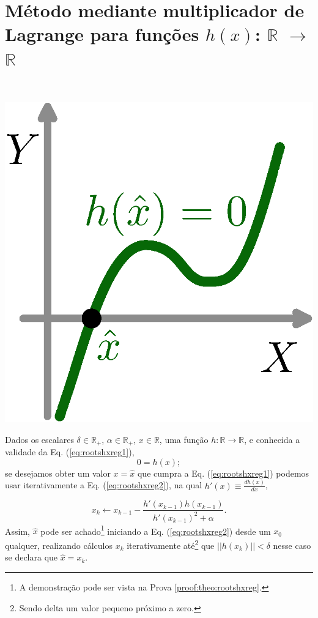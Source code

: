 
\section{ Método mediante multiplicador de Lagrange para funções $h(x)$: $\mathbb{R}$ $\rightarrow$ $\mathbb{R}$ }

\begin{theorem}\label{theo:rootshxreg}
~\\
\begin{minipage}{0.2\textwidth}
\centering
\includegraphics[width=0.90\linewidth]{chapters/roots/roots1.eps} 
\end{minipage}
\begin{minipage}{0.8\textwidth}
Dados
os escalares $\delta \in \mathbb{R}_+$, 
$\alpha \in \mathbb{R}_+$, 
$x \in \mathbb{R}$, 
uma função $h:\mathbb{R} \rightarrow \mathbb{R}$, e 
conhecida a validade da Eq. (\ref{eq:rootshxreg1}),
\begin{equation}\label{eq:rootshxreg1}
0=h(x);
\end{equation}
se desejamos obter um valor $x=\hat{x}$ que cumpra a Eq. (\ref{eq:rootshxreg1})
podemos usar iterativamente a Eq. (\ref{eq:rootshxreg2}),
na qual $h'(x)\equiv \frac{d h(x)}{d x}$,
\end{minipage}

\begin{equation}\label{eq:rootshxreg2}
x_{k} \leftarrow x_{k-1}-\frac{ h'(x_{k-1})h(x_{k-1})}{h'(x_{k-1})^2+\alpha}.
\end{equation}
Assim, $\hat{x}$ pode ser achado\footnote{A 
demonstração pode ser vista na Prova \ref{proof:theo:rootshxreg}.} 
iniciando a Eq. (\ref{eq:rootshxreg2}) desde um 
$x_{0}$ qualquer, realizando cálculos $x_{k}$ iterativamente  
até\footnote{Sendo delta um valor pequeno próximo a zero.} que $||h(x_k)||<\delta$
nesse caso se declara que $\hat{x}=x_k$.


\end{theorem}
